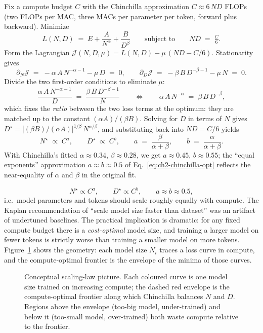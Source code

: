 \begin{derivation}
Fix a compute budget $C$ with the Chinchilla approximation
$C \approx 6\,N D$ FLOPs (two FLOPs per MAC, three MACs per parameter
per token, forward plus backward). Minimize
\[
L(N, D) \;=\; E + \frac{A}{N^{\alpha}} + \frac{B}{D^{\beta}}
\qquad\text{subject to}\qquad
N D \;=\; \tfrac{C}{6}.
\]
Form the Lagrangian
$\mathcal{J}(N, D, \mu) = L(N, D) - \mu\,(N D - C/6)$. Stationarity
gives
\[
\partial_N \mathcal{J} \;=\; -\alpha\,A\,N^{-\alpha-1} - \mu\,D
\;=\; 0,
\qquad
\partial_D \mathcal{J} \;=\; -\beta\,B\,D^{-\beta-1} - \mu\,N
\;=\; 0.
\]
Divide the two first-order conditions to eliminate $\mu$:
\[
\frac{\alpha\,A\,N^{-\alpha-1}}{D} \;=\; \frac{\beta\,B\,D^{-\beta-1}}{N}
\qquad\Longleftrightarrow\qquad
\alpha\,A\,N^{-\alpha} \;=\; \beta\,B\,D^{-\beta},
\]
which fixes the \emph{ratio} between the two loss terms at the
optimum: they are matched up to the constant
$(\alpha A)/(\beta B)$. Solving for $D$ in terms of $N$ gives
$D^\star = \big[(\beta B)/(\alpha A)\big]^{1/\beta}\,N^{\alpha/\beta}$,
and substituting back into $N D = C/6$ yields
\[
N^\star \;\propto\; C^{a},
\qquad
D^\star \;\propto\; C^{b},
\qquad
a \;=\; \frac{\beta}{\alpha + \beta},
\qquad
b \;=\; \frac{\alpha}{\alpha + \beta}.
\]
With Chinchilla's fitted $\alpha \approx 0.34$, $\beta \approx 0.28$,
we get $a \approx 0.45$, $b \approx 0.55$; the ``equal exponents''
approximation $a \approx b \approx 0.5$ of
Eq.~\eqref{eq:ch2-chinchilla-opt} reflects the near-equality of
$\alpha$ and $\beta$ in the original fit.
\end{derivation}

\begin{equation}
\label{eq:ch2-chinchilla-opt}
N^\star \propto C^{a},
\qquad
D^\star \propto C^{b},
\qquad a \approx b \approx 0.5,
\end{equation}
i.e.\ model parameters and tokens should scale roughly equally with
compute. The Kaplan recommendation of ``scale model size faster than
dataset'' was an artifact of undertuned baselines. The practical
implication is dramatic: for any fixed compute budget there is a
\emph{cost-optimal} model size, and training a larger model on fewer
tokens is strictly worse than training a smaller model on more tokens.
Figure~\ref{fig:scaling_laws} shows the geometry: each model size
$N_i$ traces a loss curve in compute, and the compute-optimal
frontier is the envelope of the minima of those curves.

\begin{figure}[H]
  \centering
  
  \caption{Conceptual scaling-law picture. Each coloured curve is
           one model size trained on increasing compute; the
           dashed red envelope is the compute-optimal frontier
           along which Chinchilla balances $N$ and $D$. Regions
           above the envelope (too-big model, under-trained) and
           below it (too-small model, over-trained) both waste
           compute relative to the frontier.}
  \label{fig:scaling_laws}
\end{figure}

